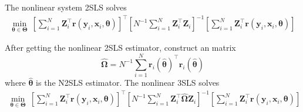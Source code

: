 \documentclass[11pt, a4paper]{article}
\numberwithin{figure}{section}
\theoremstyle{definition}
\newcommand{\0}{\mathbf{0}}
\newcommand{\bmZ}{\bm{Z}}
\newcommand{\bmr}{\bm{r}}
\newcommand{\bmx}{\bm{x}}
\newcommand{\bmy}{\bm{y}}
\begin{document}
The nonlinear system 2SLS solves
\begin{align}
    \min_{\bm{\theta} \in \bm{\Theta}} \ \left[\sum_{i=1}^N \bmZ_i^\top \bmr(\bmy_i, \bmx_i, \bm{\theta}) \right]^\top \left[N^{-1}\sum_{i=1}^N \bmZ_i^\top \bmZ_i \right]^{-1} \left[\sum_{i=1}^N \bmZ_i^\top \bmr(\bmy_i, \bmx_i, \bm{\theta}) \right]
\end{align}

After getting the nonlinear 2SLS estimator, construct an matrix 
\[\hat{\bm{\Omega}} = N^{-1}\sum_{i=1}^N \bmr_i(\hat{\bm{\theta}})^\top \bmr_i(\hat{\bm{\theta}})\]
where $\hat{\bm{\theta}}$ is the N2SLS estimator.
The nonlinear 3SLS solves
\begin{align}
    \min_{\bm{\theta} \in \bm{\Theta}} \ \left[\sum_{i=1}^N \bmZ_i^\top \bmr(\bmy_i, \bmx_i, \bm{\theta}) \right]^\top \left[N^{-1}\sum_{i=1}^N \bmZ_i^\top \hat{\bm{\Omega}}\bmZ_i \right]^{-1} \left[\sum_{i=1}^N \bmZ_i^\top \bmr(\bmy_i, \bmx_i, \bm{\theta}) \right]
\end{align}






\end{document}
